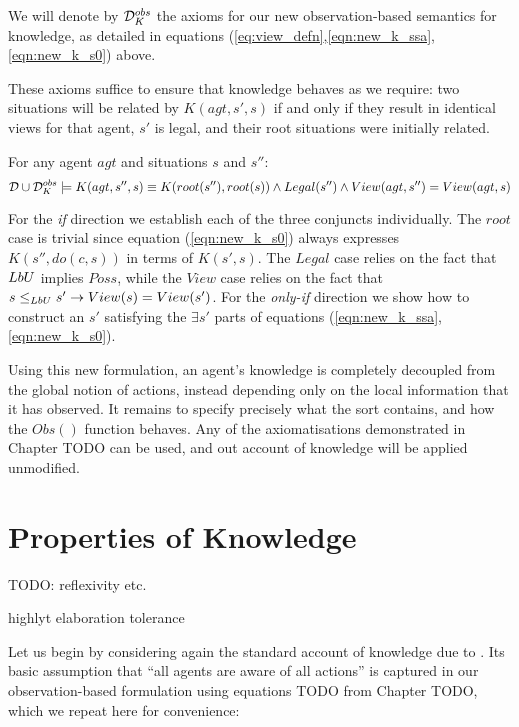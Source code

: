 \begin{defn}
We will denote by $\mathcal{D}_{K}^{obs}$ the axioms for our new observation-based
semantics for knowledge, as detailed in equations (\ref{eq:view_defn},\ref{eqn:new_k_ssa},\ref{eqn:new_k_s0})
above. 
\end{defn}
These axioms suffice to ensure that knowledge behaves as we require:
two situations will be related by $K(agt,s',s)$ if and only if they
result in identical views for that agent, $s'$ is legal, and their
root situations were initially related.

\begin{thm}
\label{thm:k_obs_equiv} For any agent $agt$ and situations $s$
and $s''$:\[
\mathcal{D}\cup\mathcal{D}_{K}^{obs}\models K(agt,s'',s)\equiv K(root(s''),root(s))\wedge Legal(s'')\wedge View(agt,s'')=View(agt,s)\]

\end{thm}
\begin{proofsketch}
For the \emph{if} direction we establish each of the three conjuncts
individually. The $root$ case is trivial since equation (\ref{eqn:new_k_s0})
always expresses $K(s'',do(c,s))$ in terms of $K(s',s)$. The $Legal$
case relies on the fact that $LbU$ implies $Poss$, while the $View$
case relies on the fact that $s\leq_{LbU}s'\rightarrow View(s)=View(s')$.
For the \emph{only-if} direction we show how to construct an $s'$
satisfying the $\exists s'$ parts of equations (\ref{eqn:new_k_ssa},\ref{eqn:new_k_s0}). 
\end{proofsketch}
Using this new formulation, an agent's knowledge is completely decoupled
from the global notion of actions, instead depending only on the local
information that it has observed. It remains to specify precisely
what the  sort contains, and how the $Obs()$ function
behaves. Any of the axiomatisations demonstrated in Chapter TODO can
be used, and out account of knowledge will be applied unmodified.


\section{Properties of Knowledge}

TODO: reflexivity etc.

highlyt elaboration tolerance

Let us begin by considering again the standard account of knowledge
due to \citep{scherl03sc_knowledge}. Its basic assumption that {}``all
agents are aware of all actions'' is captured in our observation-based
formulation using equations TODO from Chapter TODO, which we repeat
here for convenience:

